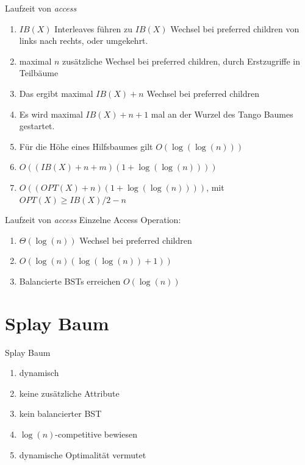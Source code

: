 \documentclass[11pt]{beamer}
\begin{document}
\begin{frame} {Laufzeit von \textit{access}}
	\begin{enumerate}
         \item $\mathit{IB}\left(X\right)$ Interleaves führen zu $\mathit{IB}\left(X\right)$  Wechsel bei preferred children von links nach rechts, oder umgekehrt.
         \item maximal $n$ zusätzliche Wechsel bei preferred children, durch Erstzugriffe in Teilbäume 
         \pause
         \item Das ergibt maximal  $\mathit{IB}\left(X\right) + n$ Wechsel bei preferred children 
         \pause
         \item Es wird maximal $\mathit{IB}\left(X\right) + n + 1$ mal an der Wurzel des Tango Baumes gestartet.
         \item Für die Höhe eines Hilfsbaumes gilt $O\left(\log\left(\log\left(n\right)\right)\right)$
         \pause
         \item $O\left(\left(\mathit{IB}\left(X\right) + n +m \right) \left( 1 + \log \left(\log\left(n\right)\right)\right) \right)$
         \pause
         \item 	$O\left(\left(\mathit{OPT}\left(X\right) + n  \right) \left( 1 + \log \left(\log\left(n\right)\right)\right) \right)$, mit $\mathit{OPT}\left(X\right) \geq \mathit{IB}\left(X\right) /2 -n $
    \end{enumerate} 
\end{frame}

\begin{frame} {Laufzeit von \textit{access}}
	Einzelne Access Operation:
	\begin{enumerate}
		\item $\Theta\left(\log\left(n\right)\right)$ Wechsel bei preferred children
		\pause
		\item $  O \left(\log\left(n\right)   \left( \log \left(\log\left(n\right)\right) + 1\right)\right)$
		\pause
		\item Balancierte BSTs erreichen $O \left( \log\left(n\right)\right)$
	\end{enumerate} 
\end{frame}

\section{Splay Baum}
	\tableofcontents[]   
\begin{frame} {Splay Baum}
	\begin{enumerate}
		\item dynamisch
		\item keine zusätzliche Attribute
		\item kein balancierter BST
		\item $\log \left(n\right)$-competitive bewiesen
		\item dynamische Optimalität vermutet
	\end{enumerate} 
\end{frame}
\end{document}
